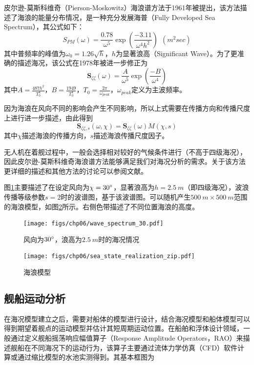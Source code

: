 皮尔逊-莫斯科维奇（Pierson-Moskowitz）海浪谱方法于1961年被提出，该方法描述了海浪的能量分布情况，是一种充分发展海普（Fully Developed Sea Spectrum），其公式如下：
\begin{equation}
S_{PM}(\omega) =\frac{0.78}{\omega^5}\exp(\frac{-3.11}{\omega^4h^2})\ \ (m^2sec)
\end{equation}
其中普频率的峰值为$\omega_0=1.26\sqrt{h}$，$h$为显著浪高（Significant Wave）。为了更准确的描述海况，该公式在1978年被进一步修正为
\begin{equation}
\mathbf{S}_{\zeta \zeta}(\omega) = \frac{A}{\omega^5}\exp(\frac{-B}{\omega^4})
\end{equation}
其中$A=\frac{487h^2}{T_0^4}$，$B=\frac{1949}{T_0^4}$，$T_0=\frac{2\pi}{\omega_{peak}}$，$\omega_{peak}$定义为主波频率。

因为海浪在风向不同的影响会产生不同影响，所以上式需要在传播方向和传播尺度上进行进一步描述，由此得到
\begin{equation}
\mathbf{S}_{\zeta\zeta,s}(\omega,\chi) = \mathbf{S}_{\zeta\zeta}(\omega)M(\chi,s)
\end{equation}
其中$\chi$描述海浪的传播方向，$s$描述海浪传播尺度因子。

无人机在着舰过程中，一般会选择相对较好的气候条件进行（不高于四级海况），因此皮尔逊-莫斯科维奇海浪谱方法能够满足我们对海况分析的需求。关于该方法更详细的描述和其他方法的讨论可以参阅文献\cite{perez2002simple}。

图\ref{fig:wave_spectrum_30}主要描述了在设定风向为$\chi =30\degree$，显著浪高为$h  =2.5\ m$（即四级海况），波浪传播等级参数$s=2$时的波谱图，基于该波谱图。可以随机产生$500\ m \times 500\ m$范围的海浪模型，如图\ref{fig:sea_state_realization_zip}所示。右侧色带描述了不同位置海浪的高度。
\begin{figure}[!ht]
	\centering
	\texttt{[image: figs/chp06/wave\_spectrum\_30.pdf]}	
	\caption{风向为$30\degree$，浪高为$2.5\ m$时的海况情况}
	\label{fig:wave_spectrum_30}
\end{figure}

\begin{figure}[!ht]
	\centering
	\texttt{[image: figs/chp06/sea\_state\_realization\_zip.pdf]}	
	\caption{海浪模型}
	\label{fig:sea_state_realization_zip}
\end{figure}

\subsection{舰船运动分析}
在海况模型建立之后，需要对船体的模型进行设计，结合海况模型和船体模型可以得到期望着舰点的运动模型并估计其短周期运动位置。在船舶和浮体设计领域，一般通过定义舰船摇荡响应幅值算子（Response Amplitude Operators，RAO）来描述舰船在不同海况下的运动行为，该算子主要通过流体力学仿真（CFD）软件计算或通过缩比模型的水池实测得到。其基本框图为

